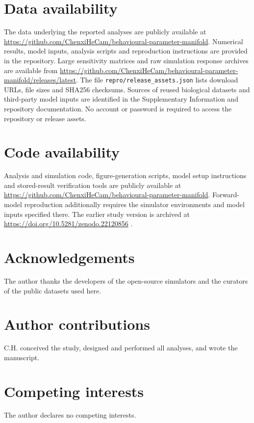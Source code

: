 \documentclass[11pt,letterpaper]{article}
\begin{document}
\section*{Data availability}
The data underlying the reported analyses are publicly available at \url{https://github.com/ChenxiHeCam/behavioural-parameter-manifold}. Numerical results, model inputs, analysis scripts and reproduction instructions are provided in the repository. Large sensitivity matrices and raw simulation response archives are available from \url{https://github.com/ChenxiHeCam/behavioural-parameter-manifold/releases/latest}. The file \texttt{repro/release\_assets.json} lists download URLs, file sizes and SHA256 checksums. Sources of reused biological datasets and third-party model inputs are identified in the Supplementary Information and repository documentation. No account or password is required to access the repository or release assets.

\section*{Code availability}
Analysis and simulation code, figure-generation scripts, model setup instructions and stored-result verification tools are publicly available at \url{https://github.com/ChenxiHeCam/behavioural-parameter-manifold}. Forward-model reproduction additionally requires the simulator environments and model inputs specified there. The earlier study version is archived at \url{https://doi.org/10.5281/zenodo.22120856} \citep{he2026data}.

\section*{Acknowledgements}
The author thanks the developers of the open-source simulators and the curators of the public datasets used here.
\section*{Author contributions}
C.H. conceived the study, designed and performed all analyses, and wrote the manuscript.
\section*{Competing interests}
The author declares no competing interests.


\end{document}
